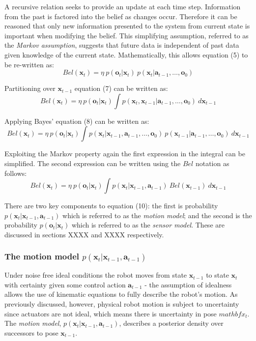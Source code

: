 \documentclass[a4paper]{article}
\begin{document}
A recursive relation seeks to provide an update at each time step. Information from the past is factored into the belief as changes occur. Therefore it can be reasoned that only new information presented to the system from current state is important when modifying the belief. This simplifying assumption, referred to as the \textit{Markov assumption}, suggests that future data is independent of past data given knowledge of the current state. Mathematically, this allows equation (5) to be re-written as:
\begin{equation}
Bel(\mathbf{x}_t) = \eta \ p(\mathbf{o}_t | \mathbf{x}_t) \ p(\mathbf{x}_t | \mathbf{a}_{t-1},\ldots,\mathbf{o}_0)
\end{equation} 

Partitioning over $\mathbf{x}_{t-1}$ equation (7) can be written as:
\begin{equation}
Bel(\mathbf{x}_t) = \eta \ p(\mathbf{o}_t | \mathbf{x}_t) \int p(\mathbf{x}_t, \mathbf{x}_{t-1} | \mathbf{a}_{t-1},\ldots,\mathbf{o}_0) \ d\mathbf{x}_{t-1}
\end{equation}

Applying Bayes' equation (8) can be written as:
\begin{equation}
Bel(\mathbf{x}_t) = \eta \ p(\mathbf{o}_t | \mathbf{x}_t) \int p(\mathbf{x}_{t} | \mathbf{x}_{t-1},\mathbf{a}_{t-1},\ldots,\mathbf{o}_0) \ p(\mathbf{x}_{t-1} | \mathbf{a}_{t-1},\ldots,\mathbf{o}_0) \ d\mathbf{x}_{t-1}
\end{equation}

Exploiting the Markov property again the first expression in the integral can be simplified. The second expression can be written using the $Bel$ notation as follows:
\begin{equation}
Bel(\mathbf{x}_t) = \eta \ p(\mathbf{o}_t | \mathbf{x}_t) \int p(\mathbf{x}_{t} | \mathbf{x}_{t-1},\mathbf{a}_{t-1}) \ Bel(\mathbf{x}_{t-1}) \ d\mathbf{x}_{t-1}
\end{equation}

There are two key components to equation (10):  the first is probability $p(\mathbf{x}_t| \mathbf{x}_{t-1}, \mathbf{a}_{t-1})$ which is referred to as the \textit{motion model}; and the second is the probability $p(\mathbf{o}_t|\mathbf{x}_t)$ which is referred to as the \textit{sensor model}. These are discussed in sections XXXX and XXXX respectively.

\subsubsection{The motion model $p(\mathbf{x}_t| \mathbf{x}_{t-1}, \mathbf{a}_{t-1})$}
Under noise free ideal conditions the robot moves from state $\mathbf{x}_{t-1}$ to state $\mathbf{x}_t$ with certainty given some control action $\mathbf{a}_{t-1}$ - the assumption of idealness allows the use of kinematic equations to fully describe the robot's motion. As previously discussed, however, physical robot motion is subject to uncertainty since actuators are not ideal, which means there is uncertainty in pose $mathbf{x}_{t}$. The \textit{motion model}, $p(\mathbf{x}_t| \mathbf{x}_{t-1}, \mathbf{a}_{t-1})$, describes a posterior density over successors to pose $\mathbf{x}_{t-1}$.
\end{document}
